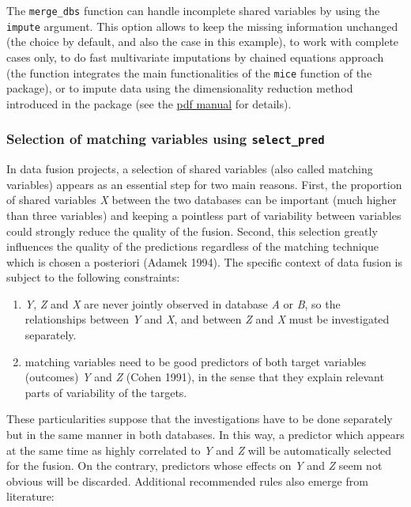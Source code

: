 The \texttt{merge\_dbs} function can handle incomplete shared variables by using the \texttt{impute} argument. This
option allows to keep the missing information unchanged (the choice by default, and also the case in this
example), to work with complete cases only, to do fast multivariate imputations by chained equations approach
(the function integrates the main functionalities of the \texttt{mice} function of the  package), or to impute data using the dimensionality reduction method introduced in the  package (see the \href{https://cran.r-project.org//web//packages//OTrecod//OTrecod.pdf}{pdf manual} for details).

\hypertarget{selection-of-matching-variables-using-select_pred}{%
\subsubsection{\texorpdfstring{Selection of matching variables using \texttt{select\_pred}}{Selection of matching variables using select\_pred}}\label{selection-of-matching-variables-using-select_pred}}

In data fusion projects, a selection of shared variables (also called matching variables) appears as an essential step for two main reasons. First, the proportion of shared variables \emph{X} between the two databases can be important (much higher than three variables) and keeping a pointless part of variability between variables could strongly reduce the quality of the fusion. Second, this selection greatly influences the quality of the predictions regardless of the matching technique which is chosen a posteriori (Adamek 1994). The specific context of data fusion is subject to the following constraints:

\begin{enumerate}
\def\labelenumi{\arabic{enumi}.}
\tightlist
\item
  \emph{Y}, \emph{Z} and \emph{X} are never jointly observed in database \emph{A} or \emph{B}, so the relationships between \emph{Y} and \emph{X}, and between \emph{Z} and \emph{X} must be investigated separately.
\item
  matching variables need to be good predictors of both target variables (outcomes) \emph{Y} and \emph{Z} (Cohen 1991), in the sense that they explain relevant parts of variability of the targets.
\end{enumerate}

These particularities suppose that the investigations have to be done separately but in the same manner in
both databases. In this way, a predictor which appears at the same time as highly correlated to \emph{Y} and \emph{Z} will be automatically selected for the fusion. On the contrary, predictors whose effects on \emph{Y} and \emph{Z} seem not obvious will be discarded. Additional recommended rules also emerge from literature:

